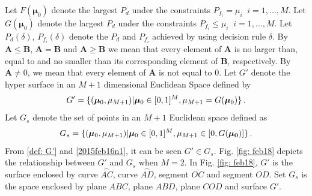 Let $F(\boldsymbol{\mu}_0)$ denote the largest $P_d$ under the constraints $P_{f_i} = \mu_i\;\;i = 1, ..., M$.
Let $G(\boldsymbol{\mu}_0)$ denote the largest $P_d$ under the constraints $P_{f_i} \leq \mu_i\;\;i = 1, ..., M$.
Let $P_d(\delta)$, $P_{f_i}(\delta)$ denote the $P_d$ and $P_{f_i}$ achieved by using decision rule $\delta$.
By $\mathbf{A} \leq \mathbf{B}$, $\mathbf{A} = \mathbf{B}$ and  $\mathbf{A} \geq \mathbf{B}$ we mean that every element of $\mathbf{A}$ is no larger than, equal to and no smaller than its corresponding element of $\mathbf{B}$, respectively. 
By $\mathbf{A} \neq 0$, we mean that every element of $\mathbf{A}$ is not equal to $0$. 
Let $G'$ denote the hyper surface in an $M+1$ dimensional Euclidean Space defined by 
\begin{equation}
 \label{def: G'}
 G' = \{(\boldsymbol{\mu}_0, \mu_{M+1})  | \boldsymbol{\mu}_0 \in [0, 1]^M, \mu_{M+1}= G(\boldsymbol{\mu}_0) \}\,.
\end{equation}
Let $G_s$ denote the set of points in an $M+1$ Euclidean space defined as 
\begin{equation}
  \label{2015feb16n1}
G_s =  \{(\boldsymbol{\mu}_0, \mu_{M+1}) | \boldsymbol{\mu}_0\in [0, 1]^M, \mu_{M+1} \in [0, G(\mathbf{\boldsymbol{\mu}_0})]
    \}\,.
  \end{equation}
  From \eqref{def: G'} and \eqref{2015feb16n1}, it can be seen $G' \in G_s$. Fig. \ref{fig: feb18} depicts the relationship between $G'$ and $G_s$ when $M=2$. In Fig. \ref{fig: feb18}, $G'$ is the surface enclosed by curve $\stackrel\frown{AC}$, curve $\stackrel\frown{AD}$, segment $\overline{OC}$ and segment $\overline{OD}$. Set $G_s$ is the space enclosed by plane $ABC$, plane $ABD$, plane $COD$ and surface $G'$.  

